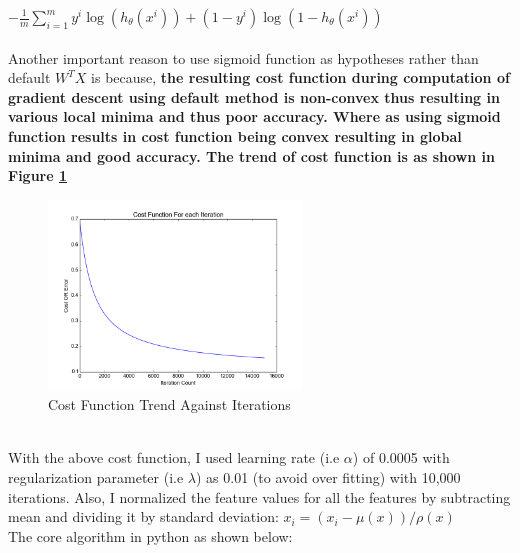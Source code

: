\documentclass[11pt, pdftex]{article}
\begin{document}
$-\frac{1}{m}\sum_{i=1}^{m}y^{i}\log(h_\theta(x^{i}))+(1-y^{i})\log(1-h_\theta(x^{i}))$
\\
\\
Another important reason to use sigmoid function as hypotheses rather than default $W^{T}X$ is because, {\bf the resulting cost function during computation of gradient descent using default method is non-convex thus resulting in various local minima and thus poor accuracy. Where as using sigmoid function results in cost function being convex resulting in global minima and good accuracy. The trend of cost function is as shown in Figure \ref{fig:costf}}
\\
\begin{figure}
    \centering
    \includegraphics[width=0.6\textwidth]{pics/costf.png} 
    \caption{Cost Function Trend Against Iterations}
    \label{fig:costf}
\end{figure}
\\
With the above cost function, I used learning rate (i.e $\alpha$) of 0.0005 with regularization parameter (i.e $\lambda$) as 0.01 (to avoid over fitting) with 10,000 iterations. Also, I normalized the feature values for all the features by subtracting mean and dividing it by standard deviation:
$x_{i} = (x_{i} - \mu(x)) / \rho(x) $
\\
The core algorithm in python as shown below:
\end{document}
